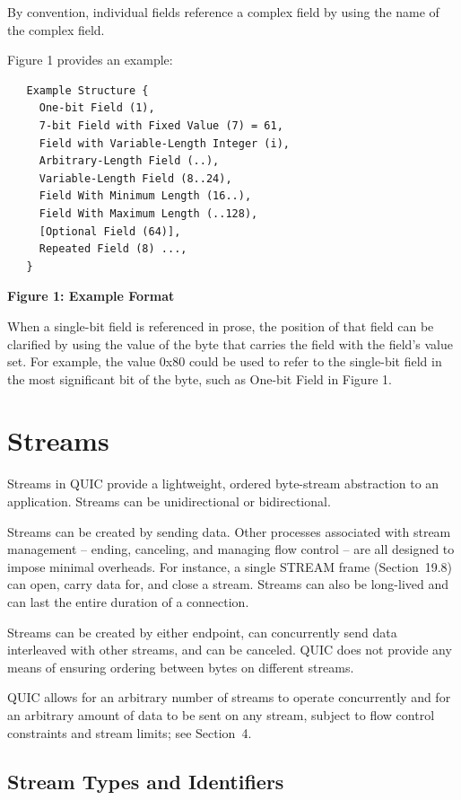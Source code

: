 \documentclass{article}
\begin{document}
By convention, individual fields reference a complex field by using the name of the complex field.

Figure 1 provides an example:

\begin{verbatim}
   Example Structure {
     One-bit Field (1),
     7-bit Field with Fixed Value (7) = 61,
     Field with Variable-Length Integer (i),
     Arbitrary-Length Field (..),
     Variable-Length Field (8..24),
     Field With Minimum Length (16..),
     Field With Maximum Length (..128),
     [Optional Field (64)],
     Repeated Field (8) ...,
   }
\end{verbatim}

\begin{center}
\textbf{Figure 1: Example Format}
\end{center}

When a single-bit field is referenced in prose, the position of that field can be clarified by using the value of the byte that carries the field with the field's value set.  For example, the value 0x80 could be used to refer to the single-bit field in the most significant bit of the byte, such as One-bit Field in Figure 1.

\section{Streams}

Streams in QUIC provide a lightweight, ordered byte-stream abstraction to an application.  Streams can be unidirectional or bidirectional.

Streams can be created by sending data.  Other processes associated with stream management -- ending, canceling, and managing flow control -- are all designed to impose minimal overheads.  For instance, a single STREAM frame (Section~19.8) can open, carry data for, and close a stream.  Streams can also be long-lived and can last the entire duration of a connection.

Streams can be created by either endpoint, can concurrently send data interleaved with other streams, and can be canceled.  QUIC does not provide any means of ensuring ordering between bytes on different streams.

QUIC allows for an arbitrary number of streams to operate concurrently and for an arbitrary amount of data to be sent on any stream, subject to flow control constraints and stream limits; see Section~4.

\subsection{Stream Types and Identifiers}
\end{document}
